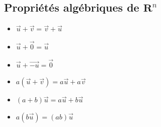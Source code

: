 \documentclass{article}
\begin{document}
\subsection{Propriétés algébriques de \( \mathbf{R}^n \) }
\begin{multicols}{2}
    \begin{itemize}
        \item \( \overrightarrow{u} + \overrightarrow{v} =  \overrightarrow{v} + \overrightarrow{u} \)
        \item \( \overrightarrow{u} + \overrightarrow{0} = \overrightarrow{u}\)
        \item \(\overrightarrow{u} + \overrightarrow{-u} = \overrightarrow{0}\)
    \end{itemize}
\columnbreak
\begin{itemize}
    \item \( a(\overrightarrow{u} + \overrightarrow{v}) = a\overrightarrow{u}  + a\overrightarrow{v} \)
    \item \( (a + b)\overrightarrow{u} = a\overrightarrow{u} + b\overrightarrow{u} \)
    \item \(a(b\overrightarrow{u}) = (ab)\overrightarrow{u}\)
\end{itemize}
\end{multicols}
\end{document}
